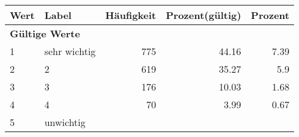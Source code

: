      \begin{longtable}{lXrrr}
     \toprule
     \textbf{Wert} & \textbf{Label} & \textbf{Häufigkeit} & \textbf{Prozent(gültig)} & \textbf{Prozent} \\
     \endhead
     \midrule
     \multicolumn{5}{l}{\textbf{Gültige Werte}}\\

     1 &
     \multicolumn{1}{X}{ sehr wichtig   } &


       \num{775} &
       \num[round-mode=places,round-precision=2]{44.16} &
         \num[round-mode=places,round-precision=2]{7.39} \\

     2 &
     \multicolumn{1}{X}{ 2   } &


       \num{619} &
       \num[round-mode=places,round-precision=2]{35.27} &
         \num[round-mode=places,round-precision=2]{5.9} \\

     3 &
     \multicolumn{1}{X}{ 3   } &


       \num{176} &
       \num[round-mode=places,round-precision=2]{10.03} &
         \num[round-mode=places,round-precision=2]{1.68} \\

     4 &
     \multicolumn{1}{X}{ 4   } &


       \num{70} &
       \num[round-mode=places,round-precision=2]{3.99} &
         \num[round-mode=places,round-precision=2]{0.67} \\

     5 &
     \multicolumn{1}{X}{ unwichtig   } &



\end{longtable}
